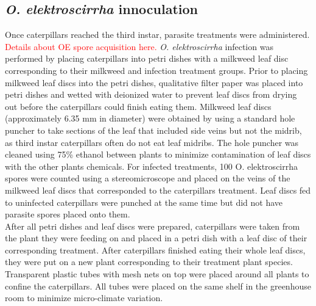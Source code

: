 \documentclass{article}
\begin{document}
\begin{multicols}{2}
    \section{\emph{O. elektroscirrha} innoculation}
    \indent Once caterpillars reached the third instar, parasite treatments were administered. \textcolor{red}{Details about OE spore acquisition here.} 
    \emph{O. elektroscirrha} infection was performed by placing caterpillars into petri dishes with a milkweed leaf disc corresponding 
    to their milkweed and infection treatment groups. Prior to placing milkweed leaf discs into the petri dishes, qualitative filter paper was placed 
    into petri dishes and wetted with deionized water to prevent leaf discs from drying out before the caterpillars could finish eating them. Milkweed 
    leaf discs (approximately 6.35 mm in diameter) were obtained by using a standard hole puncher to take sections of the leaf that included side 
    veins but not the midrib, as third instar caterpillars often do not eat leaf midribs. The hole puncher was cleaned using 75\% ethanol between 
    plants to minimize contamination of leaf discs with the other plants chemicals. For infected treatments, 100 O. elektroscirrha spores were counted 
    using a stereomicroscope and placed on the veins of the milkweed leaf discs that corresponded to the caterpillars treatment. Leaf discs fed to 
    uninfected caterpillars were punched at the same time but did not have parasite spores placed onto them.
    \\
    \indent After all petri dishes and leaf discs were prepared, caterpillars were taken from the plant they were feeding on and placed in a 
    petri dish with a leaf disc of their corresponding treatment. After caterpillars finished eating their whole leaf discs, they were put 
    on a new plant corresponding to their treatment plant species. Transparent plastic tubes with mesh nets on top were placed around all 
    plants to confine the caterpillars. All tubes were placed on the same shelf in the greenhouse room to minimize micro-climate variation. 


\end{multicols}
\end{document}
